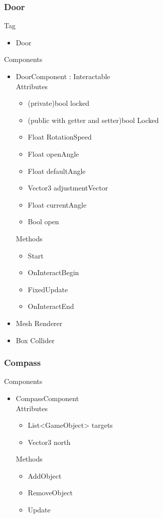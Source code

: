 \documentclass[11pt]{article}
\begin{document}
\subsubsection{Door}
Tag
\begin{itemize}
\item Door
\end{itemize}
Components
\begin{itemize}
\item DoorComponent : Interactable
\\Attributes
\begin{itemize}
\item (private)bool locked
\item (public with getter and setter)bool Locked
\item Float RotationSpeed
\item Float openAngle
\item Float defaultAngle
\item Vector3 adjustmentVector
\item Float currentAngle
\item Bool open
\end{itemize}
Methods
\begin{itemize}
\item Start
\item OnInteractBegin
\item FixedUpdate
\item OnInteractEnd
\end{itemize}
\item Mesh Renderer
\item Box Collider
\end{itemize}

\subsubsection{Compass}
Components
\begin{itemize}
\item CompassComponent
\\Attributes
\begin{itemize}
\item List<GameObject> targets
\item Vector3 north
\end{itemize}
Methods
\begin{itemize}
\item AddObject
\item RemoveObject
\item Update
\end{itemize}
\end{itemize}
\end{document}

